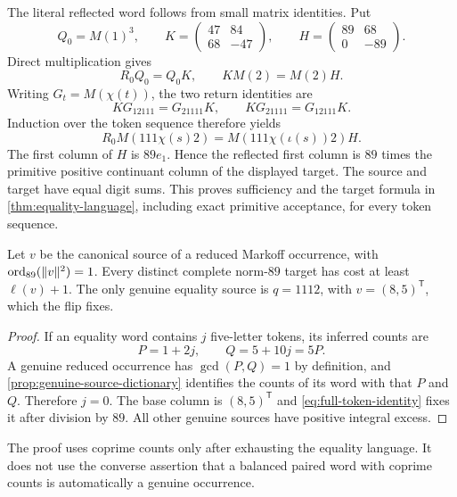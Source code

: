 The literal reflected word follows from small matrix identities. Put
\begin{equation}
 Q_0=M(1)^3,\qquad
 K=\begin{pmatrix}47&84\\68&-47\end{pmatrix},\qquad
 H=\begin{pmatrix}89&68\\0&-89\end{pmatrix}.
 \label{eq:token-intertwiners}
\end{equation}
Direct multiplication gives
\begin{equation}
 R_0Q_0=Q_0K,\qquad KM(2)=M(2)H.
 \label{eq:boundary-intertwiners}
\end{equation}
Writing $G_t=M(\chi(t))$, the two return identities are
\begin{equation}
 KG_{12111}=G_{21111}K,\qquad
 KG_{21111}=G_{12111}K.
 \label{eq:token-exchange}
\end{equation}
Induction over the token sequence therefore yields
\begin{equation}
 R_0M(111\chi(s)2)=M(111\chi(\iota(s))2)H.
 \label{eq:full-token-identity}
\end{equation}
The first column of $H$ is $89e_1$. Hence the reflected first column
is $89$ times the primitive positive continuant column of the displayed
target. The source and target have equal digit sums. This proves
sufficiency and the target formula in \cref{thm:equality-language},
including exact primitive acceptance, for every token sequence.

\begin{corollary}
\label{cor:genuine-strict}
Let $v$ be the canonical source of a reduced Markoff occurrence, with
$\operatorname{ord}_{89}(\|v\|^2)=1$. Every distinct complete norm-$89$ target has cost
at least $\ell(v)+1$. The only genuine equality source is
$q=1112$, with $v=(8,5)^{\mathsf T}$, which the flip fixes.
\end{corollary}

\begin{proof}
If an equality word contains $j$ five-letter tokens, its inferred counts
are
$$
 P=1+2j,\qquad Q=5+10j=5P.
$$
A genuine reduced occurrence has $\gcd(P,Q)=1$ by definition, and
\cref{prop:genuine-source-dictionary} identifies the counts of its word
with that $P$ and $Q$. Therefore $j=0$. The base column is $(8,5)^{\mathsf T}$
and \eqref{eq:full-token-identity} fixes it after division by $89$.
All other genuine sources have positive integral excess.
\end{proof}

The proof uses coprime counts only after exhausting the equality
language. It does not use the converse assertion that a balanced paired
word with coprime counts is automatically a genuine occurrence.
